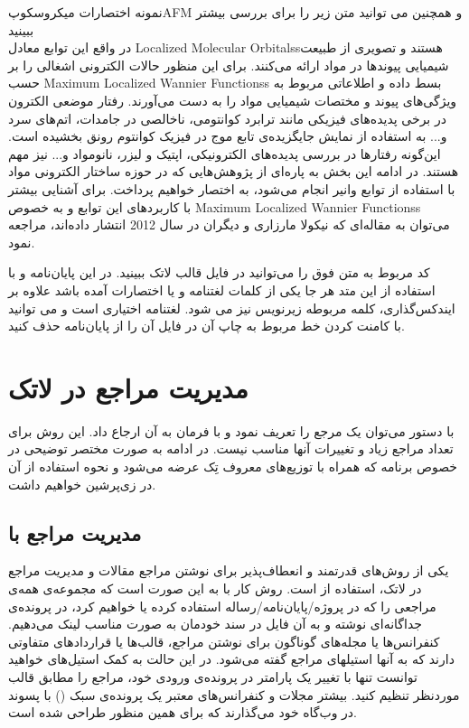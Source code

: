 نمونه اختصارات میکروسکوپ\gls{AFM} و همچنین می توانید متن زیر را برای بررسی بیشتر ببینید
\\
در واقع این توابع معادل  \glspl{Localized Molecular Orbitals}هستند و تصویری از طبیعت شیمیایی پیوند‌ها در مواد ارائه می‌کنند\cite{Boys1960}. برای این منظور حالات الکترونی اشغالی را بر حسب \glspl{Maximum Localized Wannier Functions} بسط داده و اطلاعاتی مربوط به ویژگی‌های پیوند و مختصات شیمیایی مواد را به دست می‌آورند. رفتار موضعی الکترون در برخی پدیده‌های فیزیکی مانند ترابرد کوانتومی، ناخالصی در جامدات، اتم‌های سرد و... به استفاده از نمایش جایگزیده‌ی تابع موج در فیزیک کوانتوم رونق بخشیده است. این‌گونه رفتارها در بررسی پدیده‌های الکترونیکی، اپتیک و لیزر، نانومواد و... نیز مهم هستند. در ادامه این بخش به پاره‌ای از پژوهش‌هایی که در حوزه ساختار الکترونی مواد با استفاده از توابع وانیر انجام می‌شود، به اختصار خواهیم پرداخت. برای آشنایی بیشتر با کاربردهای این توابع و به خصوص \glspl{Maximum Localized Wannier Functions}  می‌توان به مقاله‌ای که نیکولا مارزاری و دیگران در سال 2012 انتشار داده‌اند، مراجعه نمود.
 
 کد مربوط به متن فوق را می‌توانید در فایل قالب لاتک ببینید. در این پایان‌نامه و با استفاده از این متد هر جا یکی از کلمات لغتنامه و یا اختصارات آمده باشد علاوه بر ایندکس‌گذاری، کلمه مربوطه زیرنویس نیز می شود. لغتنامه اختیاری است و می توانید با کامنت کردن خط مربوط به چاپ آن در فایل   آن را از پایان‌نامه حذف کنید.
\section{مدیریت مراجع در لاتک}\label{App:RefMan}
با دستور 
  می‌توان یک مرجع را تعریف نمود و با فرمان
  به آن ارجاع داد. این روش برای تعداد مراجع زیاد و تغییرات آنها مناسب نیست. در ادامه به صورت مختصر توضیحی در خصوص برنامه  که همراه با توزیع‌های معروف تِک عرضه می‌شود و نحوه استفاده از آن در زی‌پرشین خواهیم داشت.

\subsection{ مدیریت مراجع با  \texorpdfstring{}{Bib\TeX} }
یکی از روش‌های قدرتمند و انعطاف‌پذیر برای نوشتن مراجع مقالات و مدیریت مراجع در لاتک، استفاده از   است.
 روش کار با   به این صورت است که مجموعه‌ی همه‌ی مراجعی را که در پروژه/پایان‌نامه/رساله استفاده کرده یا خواهیم کرد، 
در پرونده‌ی جداگانه‌ای نوشته و به آن فایل در سند خودمان به صورت مناسب لینک می‌دهیم.
 کنفرانس‌ها یا مجله‌های گوناگون برای نوشتن مراجع، قالب‌ها یا قراردادهای متفاوتی دارند که به آنها استیلهای مراجع گفته می‌شود.
 در این حالت به کمک ‌استیل‌های  خواهید توانست تنها با تغییر یک پارامتر در پرونده‌ی ورودی خود، مراجع را مطابق قالب موردنظر تنظیم کنید. 
 بیشتر مجلات و کنفرانس‌های معتبر یک پرونده‌ی سبک () با پسوند  در وب‌گاه خود می‌گذارند که برای همین منظور طراحی شده است.

